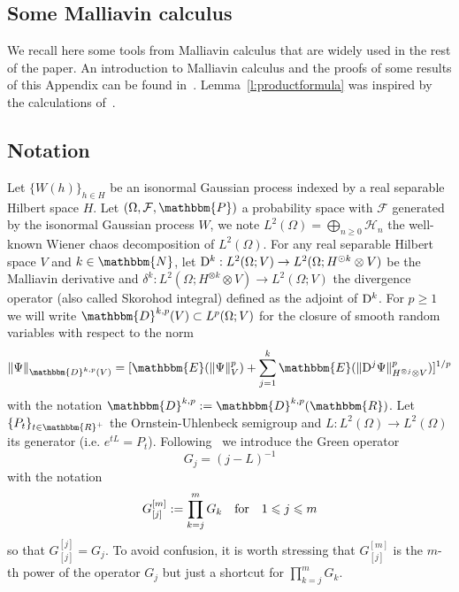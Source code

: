 \begin{appendices}
\section{Some Malliavin calculus\label{a:malliavin}}

We recall here some tools from Malliavin calculus that are widely used in the
rest of the paper. An introduction to Malliavin calculus and the proofs of
some results of this Appendix can be found
in~{\cite{nualart_2006,nourdin_peccati_2012,shigekawa_stochastic_2004}}.
Lemma~\ref{l:productformula} was inspired by the calculations
of~{\cite{nourdin_nualart_2007}}.

\subsection{Notation }\label{a:malliavin-notation}

Let $\{ W (h) \}_{h \in H}$ be an isonormal Gaussian process indexed by a real
separable Hilbert space $H$. Let $(\Omega, \mathcal{F}, \mathbbm{P})$ a
probability space with $\mathcal{F}$ generated by the isonormal Gaussian
process $W$, we note $L^2 (\Omega) = \bigoplus_{n \geqslant 0} \mathcal{H}_n$
the well-known Wiener chaos decomposition of $L^2 (\Omega)$. For any real
separable Hilbert space $V$ and $k \in \mathbbm{N}$, let $\mathrm{D}^k : L^2
(\Omega ; V) \rightarrow L^2 (\Omega ; H^{\odot k} \otimes V)$ be the
Malliavin derivative and $\delta^k : L^2 (\Omega ; H^{\otimes k} \otimes V)
\rightarrow L^2 (\Omega ; V)$ the divergence operator (also called Skorohod
integral) defined as the adjoint of $\mathrm{D}^k$. For $p \geqslant 1$ we will
write $\mathbbm{D}^{k, p} (V) \subset L^p (\Omega ; V)$ for the closure of
smooth random variables with respect to the norm
\[ \| \Psi \|_{\mathbbm{D}^{k, p} (V)} = [\mathbbm{E} (\| \Psi \|_V^p) +
   \sum_{j = 1}^k \mathbbm{E} (\| \mathD^j \Psi \|^p_{H^{\otimes j} \otimes
   V})]^{1 / p} \]
with the notation $\mathbbm{D}^{k, p} \assign \mathbbm{D}^{k, p}
(\mathbbm{R})$. Let $\{ P_t \}_{t \in \mathbbm{R}^+}$ the Ornstein-Uhlenbeck
semigroup and $L : L^2 (\Omega) \rightarrow L^2 (\Omega)$ its generator (i.e.
$e^{tL} = P_t$). Following~{\cite{shigekawa_stochastic_2004}} we introduce the
Green operator
\[ G_j = (j - L)^{- 1} \]
with the notation
\begin{equation}
  G_{[j]}^{[m]} := \prod_{k = j}^m G_k  \quad \text{for} \quad 1
  \leqslant j \leqslant m \label{e:green-op}
\end{equation}
so that $G_{[j]}^{[j]} = G_j$. To avoid confusion, it is worth stressing that
$G_{[j]}^{[m]}$ is  the $m$-th power of the operator $G_j$ but
just a shortcut for $\prod_{k = j}^m G_k $.


\end{appendices}
